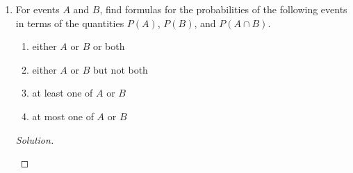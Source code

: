 \documentclass[12pt]{article}
\theoremstyle{definition}
\theoremstyle{plain}
\newenvironment{solution}
  {\begin{proof}[Solution]}
  {\end{proof}}
\newcommand{\Or}{\text{ or }}
\renewcommand{\And}{\text{ and }}
\begin{document}
\begin{enumerate}
\begin{solution}
\begin{enumerate}
	\item For associativity of set intersection, we proceed similarly.
		\begin{align*}
			x \in A \cap (B \cap C) &\iff x \in A  \And  x \in B \cap C \\
			& \iff x \in A \And (x \in B \And x \in C)\\
			& \iff (x \in A \And x \in B ) \And x \in C\\
			& \iff x \in A \cap B \And x \in C\\
			& \iff x \in (A \cap B) \cap C
		\end{align*}
		
	\item \begin{align*}
			x \in (A \cup B)^c & \iff x \notin (A \cup B)\\
			&\iff \neg (x \in A \cup B)\\
			&\iff \neg (x \in A \Or x \in B)\\
			&\iff x \notin A \And x \notin B\\
			&\iff x \in A^c \And x \in B^c\\
			&\iff x \in A^c \cap B^c
		\end{align*}
		\begin{align*}
			x \in (A \cap B)^c & \iff x \notin (A \cap B)\\
			&\iff \neg (x \in A \cap B)\\
			&\iff \neg (x \in A \And x \in B)\\
			&\iff x \notin A \Or x \notin B\\
			&\iff x \in A^c \Or x \in B^c\\
			&\iff x \in A^c \cup B^c.
		\end{align*}
	\end{enumerate}
	\end{solution}
	
\item For events $ A $ and $ B $, find formulas for the probabilities of the following events in terms of the quantities $ P(A) $, $ P(B) $, and $ P(A \cap B) $.
	\begin{enumerate}
	\item either $ A $ or $ B $ or both
	\item either $ A $ or $ B $ but not both
	\item at least one of $ A $ or $ B $
	\item at most one of $ A $ or $ B$
	\end{enumerate}
	\begin{solution}
	\begin{enumerate}
	

\end{enumerate}
\end{solution}
\end{enumerate}
\end{document}
